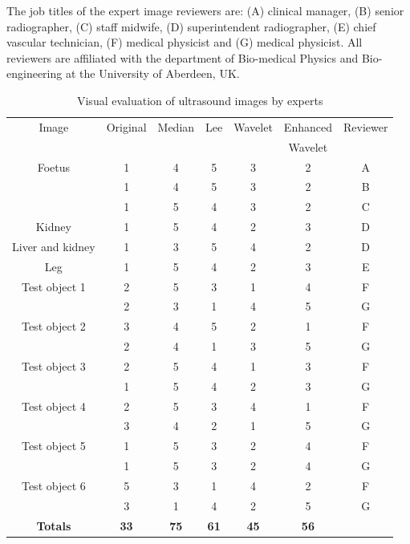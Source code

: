 \documentclass[12pt]{report}
\begin{document}
The job titles of the expert 
image reviewers are: 
(A) clinical manager, (B) senior radiographer,
(C) staff midwife, (D) superintendent radiographer,
(E) chief vascular technician, (F) medical physicist
and (G) medical physicist. 
All reviewers are affiliated with the 
department of Bio-medical Physics and Bio-engineering at the University of Aberdeen, UK.
\begin{table}[!ht]
\begin{center}
\begin{footnotesize}              
\begin{tabular}{|c|c|c|c|c|c|c|} \hline
Image	& Original & Median & Lee & Wavelet & Enhanced & Reviewer 		\\ 
	& 	   &  	    &     &         & Wavelet  & 			\\ \hline \hline
Foetus 	& 1	& 4	& 5 	& 3	& 2	& A 	\\ \cline{2-7}
	& 1     & 4     & 5     & 3     & 2     & B	\\ \cline{2-7}
	& 1     & 5     & 4     & 3     & 2     & C 	\\ \hline
Kidney	& 1	& 5 	& 4 	& 2	& 3	& D	\\ \hline   
Liver and kidney
	& 1 & 3 & 5 & 4 & 2 & D  \\ \hline
Leg
	& 1 & 5 & 4 & 2 & 3 & E \\ \hline
Test object 1
	& 2 & 5 & 3 & 1 & 4 & F \\ \cline{2-7} 
	& 2 & 3 & 1 & 4 & 5 & G \\ \hline
Test object 2
	& 3 & 4 & 5 & 2 & 1 & F \\ \cline{2-7} 
	& 2 & 4 & 1 & 3 & 5 & G \\ \hline
Test object 3
	& 2 & 5 & 4 & 1 & 3 & F \\ \cline{2-7}
	& 1 & 5 & 4 & 2 & 3 & G \\ \hline 
Test object 4
	& 2 & 5 & 3 & 4 & 1 & F \\ \cline{2-7}
	& 3 & 4 & 2 & 1 & 5 & G \\ \hline
Test object 5
	& 1 & 5 & 3 & 2 & 4 & F \\ \cline{2-7}        
	& 1 & 5 & 3 & 2 & 4 & G \\ \hline 
Test object 6
	& 5 & 3 & 1 & 4 & 2 & F \\ \cline{2-7} 
	& 3 & 1 & 4 & 2 & 5 & G \\ \hline \hline
{\bf Totals}	& {\bf 33} & {\bf 75} & {\bf 61} & {\bf 45} & {\bf 56}  & \\ \hline
\end{tabular}
\end{footnotesize}              
\end{center}
\caption{Visual evaluation of ultrasound images by experts}
\label{ultEvalTab}
\end{table}
\end{document}
